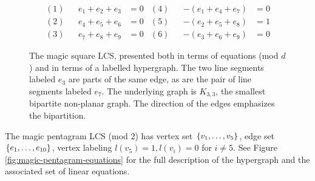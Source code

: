 \begin{figure}[h]
	\begin{center}
	\begin{multicols}{2}
	    
	    \begin{align}
	    	(1)&& e_1 + e_2 + e_3 &= 0 & (4)&& -(e_1 + e_4 + e_7) &= 0 
	    \\	(2)&& e_4 + e_5 + e_6 &= 0 & (5)&& -(e_2 + e_5 + e_8) &= 1 
	    \\	(3)&& e_7 + e_8 + e_9 &= 0 & (6)&& -(e_3 + e_6 + e_9) &= 0 
	    \end{align}
	\end{multicols}
    \end{center}
    \caption{The magic square LCS, presented both in terms of equations (mod $d$) and in terms of a labelled hypergraph. The two line segments labeled $e_3$ are parts of the same edge, as are the pair of line segments labeled $e_7$. The underlying graph is $K_{3,3}$, the smallest bipartite non-planar graph. The direction of the edges emphasizes the bipartition.}
    \label{fig:magic-square-equations}
\end{figure}
\begin{example}
\label{example:magic-pentagram}
	The magic pentagram LCS (mod $2$) has vertex set $\left\{v_1,\ldots, v_5\right\}$, edge set $\left\{e_1,\ldots, e_{10}\right\}$, vertex labeling $l(v_5) = 1, l(v_i) = 0$ for $i\neq 5$. See Figure \ref{fig:magic-pentagram-equations} for the full description of the hypergraph and the associated set of linear equations.
\end{example}
